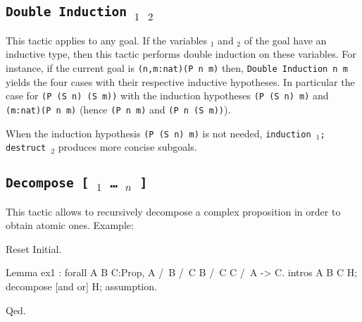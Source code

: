 
\subsection {\tt Double Induction \ident$_1$ \ident$_2$}
This tactic applies to any goal. If the variables {\ident$_1$} and {\ident$_2$}
of the goal have an inductive type, then this tactic
performs double induction on these variables.
For instance, if the current goal is \verb+(n,m:nat)(P n m)+ then,
{\tt Double Induction n m} yields the four cases with their respective
inductive hypotheses. In particular the case for
\verb+(P (S n) (S m))+
with the induction hypotheses \verb+(P (S n) m)+ and 
\verb+(m:nat)(P n m)+ (hence \verb+(P n m)+ and \verb+(P n (S m))+).

\Rem When the induction hypothesis \verb+(P (S n) m)+ is not
needed, {\tt induction \ident$_1$; destruct \ident$_2$} produces
more concise subgoals.


\subsection{\tt Decompose [ {\ident$_1$} \dots\ {\ident$_n$} ] \term}
\label{Decompose}
This tactic allows to recursively decompose a
complex proposition in order to obtain atomic ones.
Example: 

\begin{coq_eval}
Reset Initial.
\end{coq_eval}
\begin{coq_example}
Lemma ex1 : forall A B C:Prop, A /\ B /\ C \/ B /\ C \/ C /\ A -> C.
intros A B C H; decompose [and or] H; assumption.
\end{coq_example}
\begin{coq_example*}
Qed.
\end{coq_example*}

